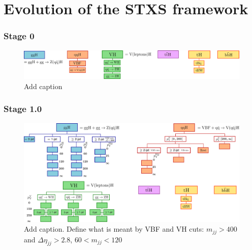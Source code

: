 \chapter{Evolution of the STXS framework}\label{app:merging_schemes}

\subsection{Stage 0}
\begin{figure}[htb!]
  \centering
  \includegraphics[width=1\linewidth]{Figures/app_merging_schemes/stage0.pdf}
  \caption[Schematic of the STXS stage 0 binning scheme]
  {
    Add caption
  }
  \label{fig:stxs_schematic_stage0}
\end{figure}

\FloatBarrier
\subsection{Stage 1.0}
\begin{figure}[htb!]
  \centering
  \includegraphics[width=1\linewidth]{Figures/app_merging_schemes/stage1p0.pdf}
  \caption[Schematic of the STXS stage 1.0 binning scheme]
  {
    Add caption. Define what is meant by VBF and VH cuts: $m_{jj}>400$ and $\Delta\eta_{jj}>2.8$, $60<m_{jj}<120$
  }
  \label{fig:stxs_schematic_stage1p0}
\end{figure}

\FloatBarrier
